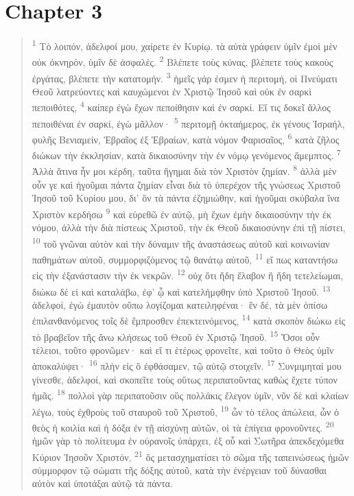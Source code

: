 \documentclass{article}
\begin{document}
\section*{Chapter 3}
\begin{verse}
\textsuperscript{1} Τὸ λοιπόν, ἀδελφοί μου, χαίρετε ἐν Κυρίῳ. τὰ αὐτὰ γράφειν ὑμῖν ἐμοὶ μὲν οὐκ ὀκνηρόν, ὑμῖν δὲ ἀσφαλές.
\textsuperscript{2} Βλέπετε τοὺς κύνας, βλέπετε τοὺς κακοὺς ἐργάτας, βλέπετε τὴν κατατομήν.
\textsuperscript{3} ἡμεῖς γάρ ἐσμεν ἡ περιτομή, οἱ Πνεύματι Θεοῦ λατρεύοντες καὶ καυχώμενοι ἐν Χριστῷ Ἰησοῦ καὶ οὐκ ἐν σαρκὶ πεποιθότες,
\textsuperscript{4} καίπερ ἐγὼ ἔχων πεποίθησιν καὶ ἐν σαρκί. Εἴ τις δοκεῖ ἄλλος πεποιθέναι ἐν σαρκί, ἐγὼ μᾶλλον·
\textsuperscript{5} περιτομῇ ὀκταήμερος, ἐκ γένους Ἰσραήλ, φυλῆς Βενιαμείν, Ἑβραῖος ἐξ Ἑβραίων, κατὰ νόμον Φαρισαῖος,
\textsuperscript{6} κατὰ ζῆλος διώκων τὴν ἐκκλησίαν, κατὰ δικαιοσύνην τὴν ἐν νόμῳ γενόμενος ἄμεμπτος.
\textsuperscript{7} Ἀλλὰ ἅτινα ἦν μοι κέρδη, ταῦτα ἥγημαι διὰ τὸν Χριστὸν ζημίαν.
\textsuperscript{8} ἀλλὰ μὲν οὖν γε καὶ ἡγοῦμαι πάντα ζημίαν εἶναι διὰ τὸ ὑπερέχον τῆς γνώσεως Χριστοῦ Ἰησοῦ τοῦ Κυρίου μου, δι’ ὃν τὰ πάντα ἐζημιώθην, καὶ ἡγοῦμαι σκύβαλα ἵνα Χριστὸν κερδήσω
\textsuperscript{9} καὶ εὑρεθῶ ἐν αὐτῷ, μὴ ἔχων ἐμὴν δικαιοσύνην τὴν ἐκ νόμου, ἀλλὰ τὴν διὰ πίστεως Χριστοῦ, τὴν ἐκ Θεοῦ δικαιοσύνην ἐπὶ τῇ πίστει,
\textsuperscript{10} τοῦ γνῶναι αὐτὸν καὶ τὴν δύναμιν τῆς ἀναστάσεως αὐτοῦ καὶ κοινωνίαν παθημάτων αὐτοῦ, συμμορφιζόμενος τῷ θανάτῳ αὐτοῦ,
\textsuperscript{11} εἴ πως καταντήσω εἰς τὴν ἐξανάστασιν τὴν ἐκ νεκρῶν.
\textsuperscript{12} οὐχ ὅτι ἤδη ἔλαβον ἢ ἤδη τετελείωμαι, διώκω δὲ εἰ καὶ καταλάβω, ἐφ’ ᾧ καὶ κατελήμφθην ὑπὸ Χριστοῦ Ἰησοῦ.
\textsuperscript{13} ἀδελφοί, ἐγὼ ἐμαυτὸν οὔπω λογίζομαι κατειληφέναι· ἓν δέ, τὰ μὲν ὀπίσω ἐπιλανθανόμενος τοῖς δὲ ἔμπροσθεν ἐπεκτεινόμενος,
\textsuperscript{14} κατὰ σκοπὸν διώκω εἰς τὸ βραβεῖον τῆς ἄνω κλήσεως τοῦ Θεοῦ ἐν Χριστῷ Ἰησοῦ.
\textsuperscript{15} Ὅσοι οὖν τέλειοι, τοῦτο φρονῶμεν· καὶ εἴ τι ἑτέρως φρονεῖτε, καὶ τοῦτο ὁ Θεὸς ὑμῖν ἀποκαλύψει·
\textsuperscript{16} πλὴν εἰς ὃ ἐφθάσαμεν, τῷ αὐτῷ στοιχεῖν.
\textsuperscript{17} Συνμιμηταί μου γίνεσθε, ἀδελφοί, καὶ σκοπεῖτε τοὺς οὕτως περιπατοῦντας καθὼς ἔχετε τύπον ἡμᾶς.
\textsuperscript{18} πολλοὶ γὰρ περιπατοῦσιν οὓς πολλάκις ἔλεγον ὑμῖν, νῦν δὲ καὶ κλαίων λέγω, τοὺς ἐχθροὺς τοῦ σταυροῦ τοῦ Χριστοῦ,
\textsuperscript{19} ὧν τὸ τέλος ἀπώλεια, ὧν ὁ θεὸς ἡ κοιλία καὶ ἡ δόξα ἐν τῇ αἰσχύνῃ αὐτῶν, οἱ τὰ ἐπίγεια φρονοῦντες.
\textsuperscript{20} ἡμῶν γὰρ τὸ πολίτευμα ἐν οὐρανοῖς ὑπάρχει, ἐξ οὗ καὶ Σωτῆρα ἀπεκδεχόμεθα Κύριον Ἰησοῦν Χριστόν,
\textsuperscript{21} ὃς μετασχηματίσει τὸ σῶμα τῆς ταπεινώσεως ἡμῶν σύμμορφον τῷ σώματι τῆς δόξης αὐτοῦ, κατὰ τὴν ἐνέργειαν τοῦ δύνασθαι αὐτὸν καὶ ὑποτάξαι αὐτῷ τὰ πάντα.
\end{verse}
\end{document}
